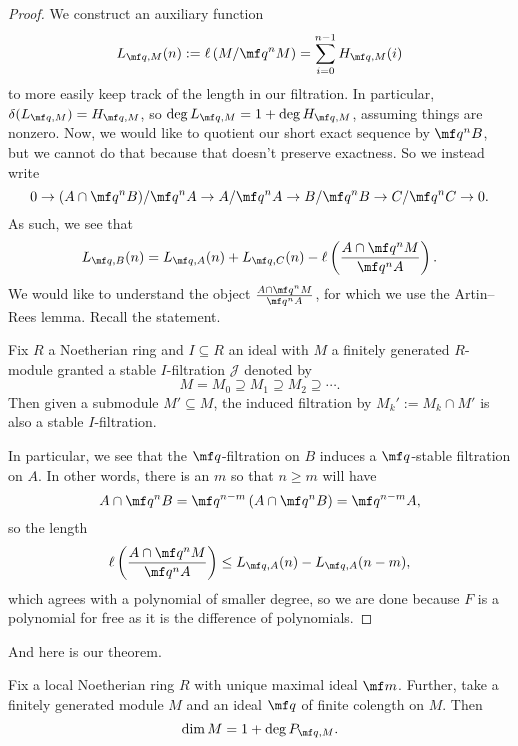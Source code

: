 \begin{proof}
	We construct an auxiliary function
	\[L_{\mf q,M}(n):=\ell\left(M/\mf q^nM\right)=\sum_{i=0}^{n-1}H_{\mf q,M}(i)\]
	to more easily keep track of the length in our filtration. In particular, $\delta(L_{\mf q,M})=H_{\mf q,M}$, so $\deg L_{\mf q,M}=1+\deg H_{\mf q,M}$, assuming things are nonzero. Now, we would like to quotient our short exact sequence by $\mf q^nB$, but we cannot do that because that doesn't preserve exactness. So we instead write
	\[0\to (A\cap\mf q^nB)/\mf q^nA\to A/\mf q^nA\to B/\mf q^nB\to C/\mf q^nC\to0.\]
	As such, we see that
	\[L_{\mf q,B}(n)=L_{\mf q,A}(n)+L_{\mf q,C}(n)-\ell\left(\frac{A\cap\mf q^nM}{\mf q^nA}\right).\]
	We would like to understand the object $\frac{A\cap\mf q^nM}{\mf q^nA}$, for which we use the Artin--Rees lemma. Recall the statement.
	\begin{theorem}
		Fix $R$ a Noetherian ring and $I\subseteq R$ an ideal with $M$ a finitely generated $R$-module granted a stable $I$-filtration $\mathcal J$ denoted by
		\[M=M_0\supseteq M_1\supseteq M_2\supseteq\cdots.\]
		Then given a submodule $M'\subseteq M$, the induced filtration by $M_k':=M_k\cap M'$ is also a stable $I$-filtration.
	\end{theorem}
	In particular, we see that the $\mf q$-filtration on $B$ induces a $\mf q$-stable filtration on $A$. In other words, there is an $m$ so that $n\ge m$ will have
	\[A\cap\mf q^nB=\mf q^{n-m}\left(A\cap\mf q^nB\right)=\mf q^{n-m}A,\]
	so the length
	\[\ell\left(\frac{A\cap\mf q^nM}{\mf q^nA}\right)\le L_{\mf q,A}(n)-L_{\mf q,A}(n-m),\]
	which agrees with a polynomial of smaller degree, so we are done because $F$ is a polynomial for free as it is the difference of polynomials.
\end{proof}
And here is our theorem.
\begin{theorem}
	Fix a local Noetherian ring $R$ with unique maximal ideal $\mf m$. Further, take a finitely generated module $M$ and an ideal $\mf q$ of finite colength on $M$. Then
	\[\dim M=1+\deg P_{\mf q,M}.\]
\end{theorem}
